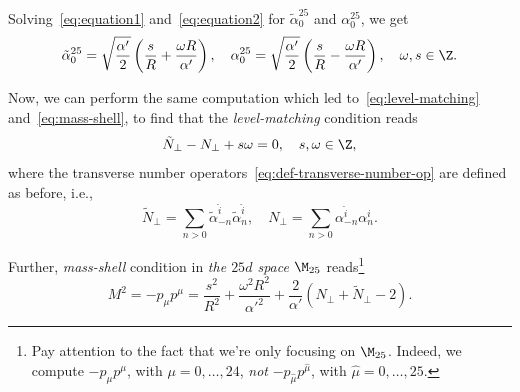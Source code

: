 Solving~\eqref{eq:equation1} and~\eqref{eq:equation2} for $\tilde{\alpha}^{25}_0$ and ${\alpha}^{25}_0$, we get
\begin{equation}
    \tilde{\alpha}^{25}_0 = \sqrt{\frac{\alpha'}{2}} \left( \frac{s}{R} + \frac{\omega R}{\alpha'} \right), \quad {\alpha}^{25}_0 = \sqrt{\frac{\alpha'}{2}} \left( \frac{s}{R} - \frac{\omega R}{\alpha'} \right), \quad \omega, s \in \Z.
\end{equation}

Now, we can perform the same computation which led to~\eqref{eq:level-matching} and~\eqref{eq:mass-shell}, to find that the \emph{level-matching} condition reads
\begin{equation}\label{eq:comp-level-matrching}
    \tilde{N}_\perp - N_\perp + s \omega = 0, \quad s,\omega \in \Z,
\end{equation}
where the transverse number operators~\eqref{eq:def-transverse-number-op} are defined as before, i.e.,
\begin{equation}\label{eq:equation3}
    \tilde{N}_\perp = \sum_{n> 0} \tilde{\alpha}^{\hat{i}}_{-n}\tilde{\alpha}^{\hat{i}}_n, \quad N_\perp = \sum_{n>  0} \alpha^{\hat{i}}_{-n}\alpha^{\hat{i}}_n.
\end{equation}

Further, \emph{mass-shell} condition in \emph{the $25d$ space $\M_{25}$} reads\footnote{Pay attention to the fact that we're only focusing on $\M_{25}$. Indeed, we compute $-p_\mu p^\mu$, with $\mu = 0, \dots, 24$, \emph{not} $-p_{\hat{\mu}}p^{\hat{\mu}}$, with $\hat{\mu} = 0, \dots, 25$.}
\begin{equation}\label{eq:comp-mass-shell}
    M^2 = - p_\mu p^\mu = \frac{s^2}{R^2} + \frac{\omega^2 R^2}{\alpha'^2} + \frac{2}{\alpha'} (N_\perp + \tilde{N}_\perp - 2) .
\end{equation}

